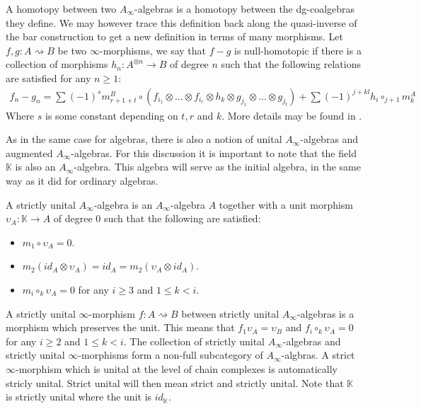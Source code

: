 \documentclass[../thesis.tex]{subfiles}
\begin{document}
        A homotopy between two $A_\infty$-algebras is a homotopy between the dg-coalgebras they define. We may however trace this definition back along the quasi-inverse of the bar construction to get a new definition in terms of many morphisms. Let $f,g: A\rightsquigarrow B$ be two $\infty$-morphisms, we say that $f-g$ is null-homotopic if there is a collection of morphisms $h_n : A^{\otimes n} \rightarrow B$ of degree $n$ such that the following relations are satisfied for any $n \geq 1$:
        \begin{multline*}
            f_n - g_n = \sum (-1)^s m^B_{r+1+t}\circ (f_{i_1}\otimes ... \otimes f_{i_r} \otimes h_k \otimes g_{j_1} \otimes ... \otimes g_{j_t}) +  \sum (-1)^{j+kl}h_i \circ_{j+1} m_k^A
        \end{multline*}
        Where $s$ is some constant depending on $t,r$ and $k$. More details may be found in \cite{LefevreHasegawa03}.

        As in the same case for algebras, there is also a notion of unital $A_\infty$-algebras and augmented $A_\infty$-algebras. For this discussion it is important to note that the field $\mathbb{K}$ is also an $A_\infty$-algebra. This algebra will serve as the initial algebra, in the same way as it did for ordinary algebras.

        \begin{definition}\label{def: strict-unit}
            A strictly unital $A_\infty$-algebra is an $A_\infty$-algebra $A$ together with a unit morphism $\upsilon_A : \mathbb{K} \rightarrow A$ of degree $0$ such that the following are satisfied:
            \begin{itemize}
                \item $m_1\circ \upsilon_A = 0$.
                \item $m_2(id_A \otimes \upsilon_A) = id_A = m_2(\upsilon_A\otimes id_A)$.
                \item $m_i \circ_k \upsilon_A = 0$ for any $i\geq 3$ and $1 \leq k < i$.
            \end{itemize}
        \end{definition}

        A strictly unital $\infty$-morphism $f: A \rightsquigarrow B$ between strictly unital $A_\infty$-algebras is a morphism which preserves the unit. This means that $f_1\upsilon_A = \upsilon_B$ and $f_i \circ_k \upsilon_A = 0$ for any $i \geq 2$ and $1 \leq k < i$. The collection of strictly unital $A_\infty$-algebras and strictly unital $\infty$-morphisms form a non-full subcategory of $A_\infty$-algbras. A strict $\infty$-morphism which is unital at the level of chain complexes is automatically stricly unital. Strict unital will then mean strict and strictly unital. Note that $\mathbb{K}$ is strictly unital where the unit is $id_\mathbb{K}$.
\end{document}
